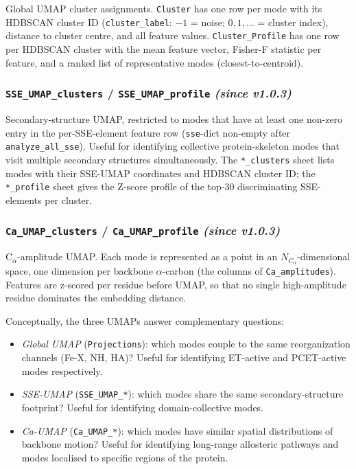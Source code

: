 \documentclass[11pt,a4paper,twoside]{article}
\theoremstyle{remark}
\begin{document}
Global UMAP cluster assignments. \texttt{Cluster} has one row per
mode with its HDBSCAN cluster ID (\texttt{cluster\_label}: $-1$ =
noise; $0, 1, \ldots$ = cluster index), distance to cluster centre,
and all feature values.
\texttt{Cluster\_Profile} has one row per HDBSCAN cluster with
the mean feature vector, Fisher-F statistic per feature, and a
ranked list of representative modes (closest-to-centroid).

\subsubsection*{\texttt{SSE\_UMAP\_clusters} / \texttt{SSE\_UMAP\_profile}
                  \emph{(since v1.0.3)}}
\label{app:wb-embed-ssumap}

Secondary-structure UMAP, restricted to modes that have at least one
non-zero entry in the per-SSE-element feature row (\texttt{sse}-dict
non-empty after \texttt{analyze\_all\_sse}). Useful for identifying
collective protein-skeleton modes that visit multiple secondary
structures simultaneously. The \texttt{*\_clusters} sheet lists
modes with their SSE-UMAP coordinates and HDBSCAN cluster ID; the
\texttt{*\_profile} sheet gives the Z-score profile of the top-30
discriminating SSE-elements per cluster.

\subsubsection*{\texttt{Ca\_UMAP\_clusters} / \texttt{Ca\_UMAP\_profile}
                  \emph{(since v1.0.3)}}
\label{app:wb-embed-caumap}

C$_\alpha$-amplitude UMAP. Each mode is represented as a point in an
$N_{C_\alpha}$-dimensional space, one dimension per backbone $\alpha$-carbon
(the columns of \texttt{Ca\_amplitudes}). Features are z-scored
per residue before UMAP, so that no single high-amplitude residue
dominates the embedding distance.

Conceptually, the three UMAPs answer complementary questions:
\begin{itemize}\setlength{\itemsep}{0pt}
  \item \emph{Global UMAP} (\texttt{Projections}): which modes
        couple to the same reorganization channels (Fe-X, NH, HA)?
        Useful for identifying ET-active and PCET-active modes
        respectively.
  \item \emph{SSE-UMAP} (\texttt{SSE\_UMAP\_*}): which modes share
        the same secondary-structure footprint? Useful for
        identifying domain-collective modes.
  \item \emph{Ca-UMAP} (\texttt{Ca\_UMAP\_*}): which modes have
        similar spatial distributions of backbone motion? Useful
        for identifying long-range allosteric pathways and modes
        localised to specific regions of the protein.
\end{itemize}
\end{document}
